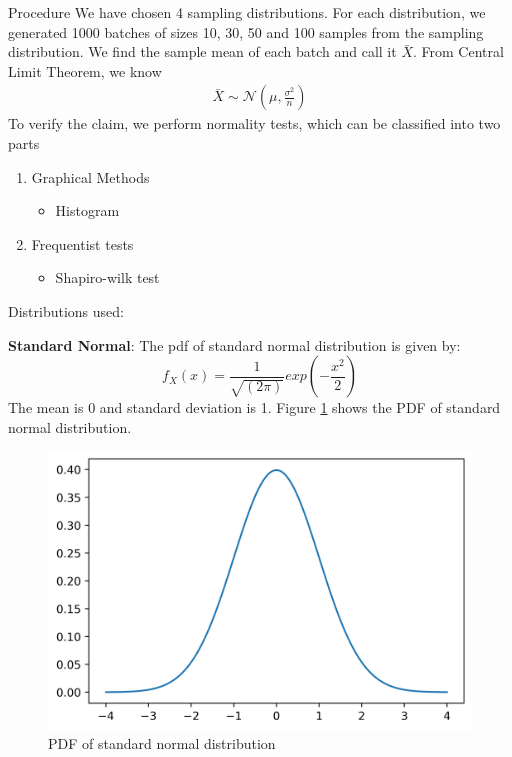 \documentclass{beamer}
\begin{document}
\begin{frame}{Procedure}
We have chosen 4 sampling distributions. For each distribution, we generated 1000 batches of sizes 10, 30, 50 and 100 samples from the sampling distribution. We find the sample mean of each batch and call it $\bar{X}$. From Central Limit Theorem, we know
\begin{align}
    \bar{X} \sim \mathcal{N}\left(\mu, \frac{\sigma^2}{n}\right)
\end{align}
To verify the claim, we perform normality tests, which can be classified into two parts
\begin{enumerate}
    \item Graphical Methods
    \begin{itemize}
        \item Histogram
    \end{itemize}
    \item{Frequentist tests}
    \begin{itemize}
        \item Shapiro-wilk test
    \end{itemize}
\end{enumerate}
\end{frame}

\begin{frame}{}
Distributions used:

    \textbf{Standard Normal}: The pdf of standard normal distribution is given by:
    $$f_X(x) = \dfrac{1}{\sqrt{(2\pi)}}exp\left(-\dfrac{x^2}{2}\right)$$
    The mean is 0 and standard deviation is 1. Figure \ref{normal_pdf} shows the PDF of standard normal distribution.
\end{frame}
\begin{frame}{}
        \begin{figure}[H]
        \centering
        \includegraphics[scale=0.5]{images/gaussian.png}
        \caption{PDF of standard normal distribution}
        \label{normal_pdf}
    \end{figure}
\end{frame}
\end{document}

